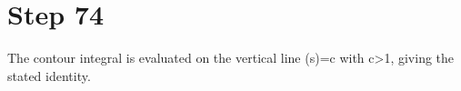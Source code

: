 \section*{Step 74}

The contour integral is evaluated on the vertical line \Re(s)=c with c>1, giving the stated identity.
